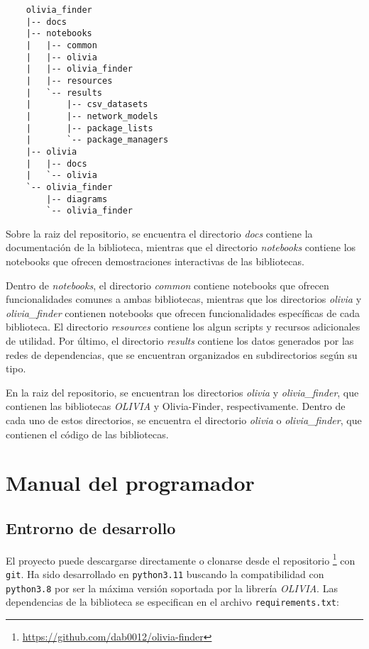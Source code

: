 \begin{verbatim}
    olivia_finder
    |-- docs
    |-- notebooks
    |   |-- common
    |   |-- olivia
    |   |-- olivia_finder
    |   |-- resources
    |   `-- results
    |       |-- csv_datasets
    |       |-- network_models
    |       |-- package_lists
    |       `-- package_managers
    |-- olivia
    |   |-- docs
    |   `-- olivia
    `-- olivia_finder
        |-- diagrams
        `-- olivia_finder
    \end{verbatim}


Sobre la raiz del repositorio, se encuentra el directorio \textit{docs} contiene la documentación de la biblioteca, mientras que el directorio \textit{notebooks}
contiene los notebooks que ofrecen demostraciones interactivas de las bibliotecas.

Dentro de \textit{notebooks}, el directorio \textit{common} contiene notebooks que ofrecen funcionalidades comunes
a ambas bibliotecas, mientras que los directorios \textit{olivia} y \textit{olivia\_finder} contienen notebooks
que ofrecen funcionalidades específicas de cada biblioteca.
El directorio \textit{resources} contiene los algun scripts
y recursos adicionales de utilidad. Por último, el directorio \textit{results} contiene los datos generados por las
redes de dependencias, que se encuentran organizados en subdirectorios según su tipo.

En la raiz del repositorio, se encuentran los directorios \textit{olivia} y \textit{olivia\_finder}, que contienen
las bibliotecas \textit{OLIVIA} y Olivia-Finder, respectivamente. Dentro de cada uno de estos directorios, se encuentra
el directorio \textit{olivia} o \textit{olivia\_finder}, que contienen el código de las bibliotecas.


\section{Manual del programador}

\subsection{Entrorno de desarrollo}

El proyecto puede descargarse directamente o clonarse desde el repositorio \footnote{\url{https://github.com/dab0012/olivia-finder}}
con \texttt{git}. Ha sido desarrollado en \texttt{python3.11} buscando la compatibilidad con \texttt{python3.8} por
ser la máxima versión soportada por la librería \textit{OLIVIA}.
Las dependencias de la biblioteca se especifican en el archivo \texttt{requirements.txt}:


